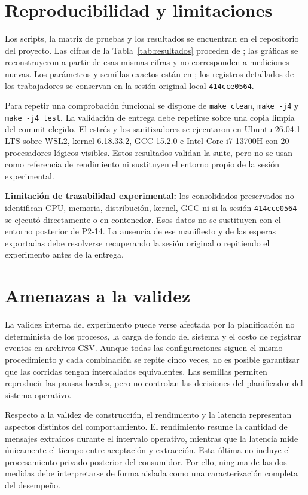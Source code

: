 \documentclass[conference]{IEEEtran}
\begin{document}
\section{Reproducibilidad y limitaciones}
Los scripts, la matriz de pruebas y los resultados se encuentran en el repositorio del proyecto. Las cifras de la Tabla~\ref{tab:resultados} proceden de ; las gráficas se reconstruyeron a partir de esas mismas cifras y no corresponden a mediciones nuevas. Los parámetros y semillas exactos están en ; los registros detallados de los trabajadores se conservan en la sesión original local \texttt{414cce0564}.

Para repetir una comprobación funcional se dispone de \texttt{make clean}, \texttt{make -j4} y \texttt{make -j4 test}. La validación de entrega debe repetirse sobre una copia limpia del commit elegido. El estrés y los sanitizadores se ejecutaron en Ubuntu 26.04.1 LTS sobre WSL2, kernel 6.18.33.2, GCC 15.2.0 e Intel Core i7-13700H con 20 procesadores lógicos visibles. Estos resultados validan la suite, pero no se usan como referencia de rendimiento ni sustituyen el entorno propio de la sesión experimental.

\textbf{Limitación de trazabilidad experimental:} los consolidados preservados no identifican CPU, memoria, distribución, kernel, GCC ni si la sesión \texttt{414cce0564} se ejecutó directamente o en contenedor. Esos datos no se sustituyen con el entorno posterior de P2-14. La ausencia de ese manifiesto y de las esperas exportadas debe resolverse recuperando la sesión original o repitiendo el experimento antes de la entrega.

\section{Amenazas a la validez}
La validez interna del experimento puede verse afectada por la planificación no determinista de los procesos, la carga de fondo del sistema y el costo de registrar eventos en archivos CSV. Aunque todas las configuraciones siguen el mismo procedimiento y cada combinación se repite cinco veces, no es posible garantizar que las corridas tengan intercalados equivalentes. Las semillas permiten reproducir las pausas locales, pero no controlan las decisiones del planificador del sistema operativo.

Respecto a la validez de construcción, el rendimiento y la latencia representan aspectos distintos del comportamiento. El rendimiento resume la cantidad de mensajes extraídos durante el intervalo operativo, mientras que la latencia mide únicamente el tiempo entre aceptación y extracción. Esta última no incluye el procesamiento privado posterior del consumidor. Por ello, ninguna de las dos medidas debe interpretarse de forma aislada como una caracterización completa del desempeño.
\end{document}
